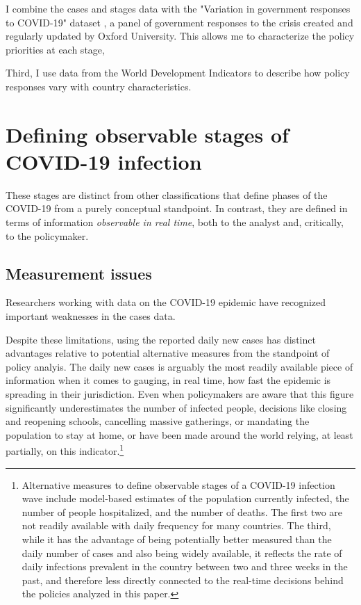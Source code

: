 \documentclass[12pt,english]{article}
\begin{document}
I combine the cases and stages data with the "Variation in government responses to COVID-19" dataset  \citep{Hale2020}, a panel of government responses to the crisis created and regularly updated by Oxford University.  This allows me to characterize the policy priorities at each stage,

Third, I use data from the World Development Indicators \citep{WorldBank2020} to describe how policy responses vary with country characteristics.




\section{Defining observable stages of COVID-19 infection\label{sec:Stages}}

These stages are distinct from other classifications that define phases of the COVID-19 from a purely conceptual standpoint. In contrast, they are defined in terms of information \emph{observable in real time}, both to the analyst and, critically, to the policymaker.

\subsection{Measurement issues}

Researchers working with data on the COVID-19 epidemic have recognized important weaknesses in the cases data.

Despite these limitations, using the reported daily new cases has distinct advantages relative to potential alternative measures from the standpoint of policy analyis. The daily new cases is arguably the most readily available piece of information when it comes to gauging, in real time, how fast the epidemic is spreading in their jurisdiction.  Even when policymakers are aware that this figure significantly underestimates the number of infected people, decisions like closing and reopening schools, cancelling massive gatherings, or mandating the population to stay at home, or have been made around the world relying, at least partially, on this indicator.\footnote{Alternative measures to define observable stages of a COVID-19 infection wave include model-based estimates of the population currently infected, the number of people hospitalized, and the number of deaths. The first two are not readily available with daily frequency for many countries. The third, while it has the advantage of being potentially better measured than the daily number of cases and also being widely available, it reflects the rate of daily infections prevalent in the country between two and three weeks in the past, and therefore less directly connected to the real-time decisions behind the policies analyzed in this paper.}
\end{document}
